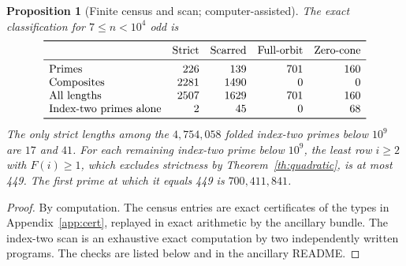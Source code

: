 \documentclass[11pt,reqno]{amsart}
\newtheorem{proposition}[theorem]{Proposition}
\begin{document}
\begin{proposition}[Finite census and scan; computer-assisted]\label{prop:census}
The exact classification for \(7\le n<10^4\) odd is
\[
\begin{array}{lrrrr}
\toprule
 & \text{Strict} & \text{Scarred} & \text{Full-orbit}
       & \text{Zero-cone}\\
\midrule
\text{Primes} & 226 & 139 & 701 & 160\\
\text{Composites} & 2281 & 1490 & 0 & 0\\
\text{All lengths} & 2507 & 1629 & 701 & 160\\
\text{Index-two primes alone} & 2 & 45 & 0 & 68\\
\bottomrule
\end{array}
\]
The only strict lengths among the \(4{,}754{,}058\) folded index-two primes below \(10^9\) are \(17\) and \(41\). For each remaining index-two prime below \(10^9\), the least row \(i\ge2\) with \(F(i)\ge1\), which excludes strictness by Theorem~\ref{th:quadratic}, is at most 449. The first prime at which it equals 449 is \(700{,}411{,}841\).
\end{proposition}
\begin{proof}
By computation. The census entries are exact certificates of the types in Appendix~\ref{app:cert}, replayed in exact arithmetic by the ancillary bundle. The index-two scan is an exhaustive exact computation by two independently written programs. The checks are listed below and in the ancillary README.
\end{proof}
\end{document}
